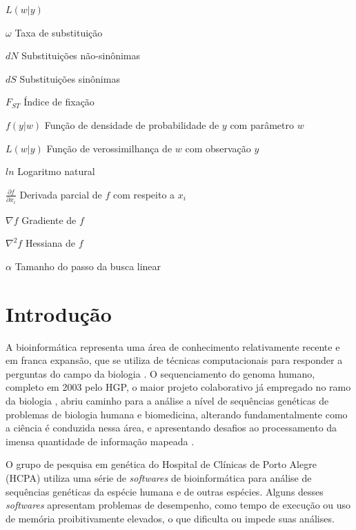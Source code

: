 \documentclass[cic,tc]{iiufrgs}
\begin{document}
\begin{listofsymbols}{$L(w|y)$}
    \item[$\omega$] Taxa de substituição
    \item[$dN$] Substituições não-sinônimas
    \item[$dS$] Substituições sinônimas
    \item[$F_{ST}$] Índice de fixação
    \item[$f(y|w)$] Função de densidade de probabilidade de $y$ com parâmetro $w$
    \item[$L(w|y)$] Função de verossimilhança de $w$ com observação $y$
    \item[$ln$] Logaritmo natural
    \item[$\frac{\partial f}{\partial x_i}$] Derivada parcial de $f$ com respeito a $x_i$
    \item[$\nabla f$] Gradiente de $f$
    \item[$\nabla^2 f$] Hessiana de $f$
    \item[$\alpha$] Tamanho do passo da busca linear
\end{listofsymbols}

\tableofcontents

%
%
%
%

\chapter{Introdução}
\label{chap:intro}

%
%
A bioinformática representa uma área de conhecimento relativamente recente e em
franca expansão, que se utiliza de técnicas computacionais para responder a
perguntas do campo da biologia \cite{baxevanis2020bioinformatics}. O
sequenciamento do genoma humano, completo em 2003 pelo HGP, o maior projeto
colaborativo já empregado no ramo da biologia \cite{tripp2011economic}, abriu
caminho para a análise a nível de sequências genéticas de problemas de biologia
humana e biomedicina, alterando fundamentalmente como a ciência é conduzida
nessa área, e apresentando desafios ao processamento da imensa quantidade de
informação mapeada \cite{baxevanis2020bioinformatics}.

%
%
O grupo de pesquisa em genética do Hospital de Clínicas de Porto Alegre (HCPA)
utiliza uma série de \textit{softwares} de bioinformática para análise de sequências
genéticas da espécie humana e de outras espécies. Alguns desses \textit{softwares}
apresentam problemas de desempenho, como tempo de execução ou uso de memória
proibitivamente elevados, o que dificulta ou impede suas análises.
\end{document}
